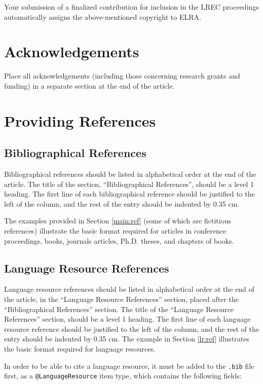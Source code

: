 \documentclass[10pt, a4paper]{article}
\begin{document}
Your submission of a finalized contribution for inclusion in the LREC
proceedings automatically assigns the above-mentioned copyright to ELRA.


\section{Acknowledgements}

Place all acknowledgements (including those concerning research grants and
funding) in a separate section at the end of the article.

\section{Providing References}

\subsection{Bibliographical References}
Bibliographical references should be listed in alphabetical order at the
end of the article. The title of the section, ``Bibliographical References'',
should be a level 1 heading. The first line of each bibliographical reference
should be justified to the left of the column, and the rest of the entry should
be indented by 0.35 cm.

The examples provided in Section \ref{main:ref} (some of which are fictitious
references) illustrate the basic format required for articles in conference
proceedings, books, journals articles, Ph.D. theses, and chapters of books.

\subsection{Language Resource References}

Language resource references should be listed in alphabetical order at the end
of the article, in the ``Language Resource References'' section, placed after
the ``Bibliographical References'' section. The title of the ``Language Resource
References'' section, should be a level 1 heading. The first line of each
language resource reference should be justified to the left of the column, and
the rest of the entry should be indented by 0.35 cm. The example in Section 
\ref{lr:ref} illustrates the basic format required for language resources.

In order to be able to cite a language resource, it must be added to
the \texttt{.bib} file first, as a \texttt{@LanguageResource} item type, which
contains the following fields:
\end{document}
